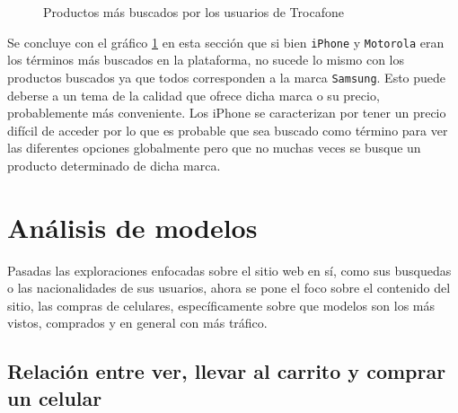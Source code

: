 \documentclass[a4paper]{article}
\begin{document}
\begin{figure}[h!]
	\caption{Productos más buscados por los usuarios de Trocafone}
	\label{fig:searchedproduct}
\end{figure}

Se concluye con el gráfico \ref{fig:searchedproduct} en esta sección que si bien \texttt{iPhone} y \texttt{Motorola} eran los términos más buscados en la plataforma, no sucede lo mismo con los productos buscados ya que todos corresponden a la marca \texttt{Samsung}. Esto puede deberse a un tema de la calidad que ofrece dicha marca o su precio, probablemente más conveniente. Los iPhone se caracterizan por tener un precio difícil de acceder por lo que es probable que sea buscado como término para ver las diferentes opciones globalmente pero que no muchas veces se busque un producto determinado de dicha marca.

\section{Análisis de modelos}

Pasadas las exploraciones enfocadas sobre el sitio web en sí, como sus busquedas o las nacionalidades de sus usuarios, ahora se pone el foco sobre el contenido del sitio, las compras de celulares, específicamente sobre que modelos son los más vistos, comprados y en general con más tráfico.

\subsection{Relación entre ver, llevar al carrito y comprar un celular}
\end{document}
